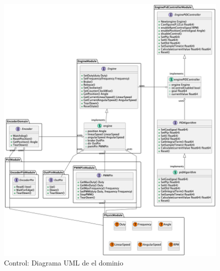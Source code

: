 \begin{figure}[H]
    \centering
    \includegraphics[height=0.5\textheight]{./part/Proyecto_ejecutivo/memoria_descriptiva/descripcionDelProyecto/control/uml/controlDomain}
    \caption{Control: Diagrama UML de el dominio}\label{fig:Control-Diagrama UML de el dominio}
\end{figure}

